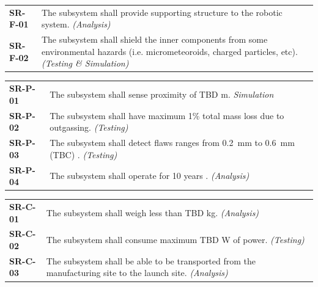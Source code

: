 \documentclass[12pt, letterpaper]{article}
\begin{document}
\vspace{-5pt}
\begin{longtable}{P{2cm}P{13.75cm}}
\textbf{SR-F-01}	& The subsystem shall provide supporting structure to the robotic system. \textit{(Analysis)}							\\
\textbf{SR-F-02}	& The subsystem shall shield the inner components from some environmental hazards (i.e. micrometeoroids, charged particles, etc). \textit{(Testing \& Simulation)}					\\
\end{longtable}
\vspace{-10pt}
\begin{longtable}{P{2cm}P{13.75cm}}
\textbf{SR-P-01}	& The subsystem shall sense proximity of TBD \si{\m}.	\textit{Simulation}										\\
\textbf{SR-P-02}	& The subsystem shall have maximum 1\% total mass loss due to outgassing. \textit{(Testing)} \cite{NASA_outgassing}			\\
\textbf{SR-P-03}	& The subsystem shall detect flaws ranges from \SI{0.2}{\milli\meter} to \SI{0.6}{\milli\meter} (TBC) \cite{NASAinspect_Hayati}. \textit{(Testing)}				\\
\textbf{SR-P-04}	& The subsystem shall operate for 10 years \cite{RFP}. \textit{(Analysis)}										\\
\end{longtable}
\vspace{-10pt}
\begin{longtable}{P{2cm}P{13.75cm}}
\textbf{SR-C-01}	& The subsystem shall weigh less than TBD \si{\kg}. \textit{(Analysis)}													\\
\textbf{SR-C-02}	& The subsystem shall consume maximum TBD \si{\watt} of power. \textit{(Testing)}								\\
\textbf{SR-C-03}	& The subsystem shall be able to be transported from the manufacturing site to the launch site. \textit{(Analysis)}	\\
\end{longtable}
\vspace{-10pt}
\end{document}
